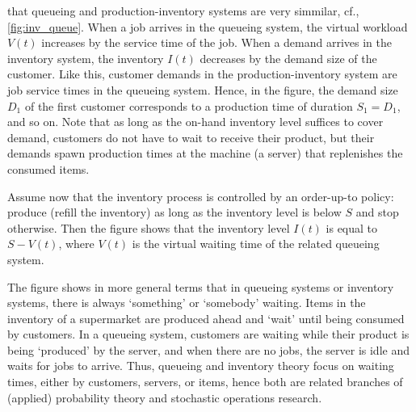 \documentclass[stochastic-or.tex]{subfiles}
\begin{document}
 that queueing and production-inventory systems are very simmilar, cf., \cref{fig:inv_queue}.
When a job arrives in the queueing system, the virtual workload~$V(t)$ increases by the service time of the job.
When a demand arrives in the inventory system, the inventory $I(t)$ decreases by the demand size of the customer.
Like this, customer demands in the production-inventory system are job service times in the queueing system.
Hence, in the figure, the demand size $D_1$ of the first customer corresponds to a production time of duration $S_1=D_1$, and so on.
Note that as long as the on-hand inventory level suffices to cover demand, customers do not have to wait to receive their product, but their demands spawn production times at the machine (a server) that replenishes the consumed items.

Assume now that the inventory process is controlled by an order-up-to policy: produce (refill the inventory) as long as the inventory level is below $S$ and stop otherwise.
Then the figure shows that the inventory level $I(t)$ is equal to $S-V(t)$, where $V(t)$ is the virtual waiting time of the related queueing system.

The figure shows in more general terms that in queueing systems or inventory systems, there is always `something' or `somebody' waiting.
Items in the inventory of a supermarket are produced ahead and `wait' until being consumed by customers.
In a queueing system, customers are waiting while their product is being `produced' by the server, and when there are no jobs, the server is idle and waits for jobs to arrive.
Thus, queueing and inventory theory focus on waiting times, either by customers, servers, or items, hence both are related branches of (applied) probability theory and stochastic operations research.
\end{document}
